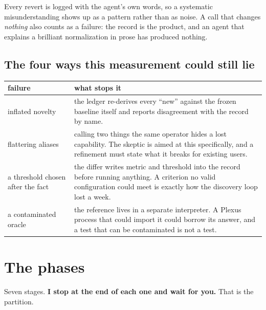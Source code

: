\documentclass[11pt,a4paper]{article}
\begin{document}
Every revert is logged with the agent's own words, so a systematic misunderstanding shows up as a
pattern rather than as noise. A call that changes \emph{nothing} also counts as a failure: the
record is the product, and an agent that explains a brilliant normalization in prose has produced
nothing.

\subsection{The four ways this measurement could still lie}

\begin{center}
\small
\begin{tabular}{@{}p{3.4cm} p{11.6cm}@{}}
\toprule
\textbf{failure} & \textbf{what stops it}\\
\midrule
inflated novelty & the ledger re-derives every ``new'' against the frozen baseline itself and
reports disagreement with the record by name.\\
flattering aliases & calling two things the same operator hides a lost capability. The skeptic is
aimed at this specifically, and a refinement must state what it breaks for existing users.\\
a threshold chosen after the fact & the differ writes metric and threshold into the record before
running anything. A criterion no valid configuration could meet is exactly how the discovery loop
lost a week.\\
a contaminated oracle & the reference lives in a separate interpreter. A Plexus process that could
import it could borrow its answer, and a test that can be contaminated is not a test.\\
\bottomrule
\end{tabular}
\end{center}

\section{The phases}

Seven stages. \textbf{I stop at the end of each one and wait for you.} That is the partition.
\end{document}
